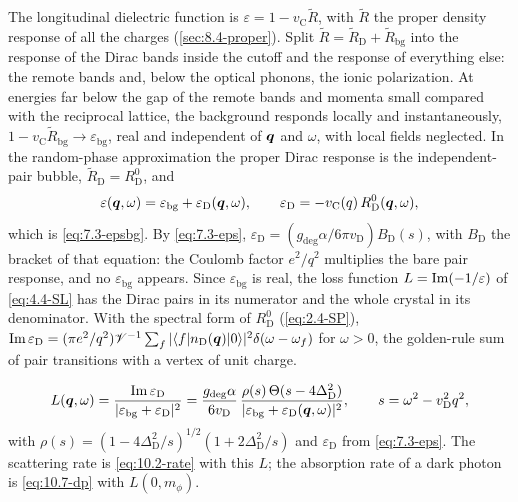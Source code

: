 The longitudinal dielectric function is $\varepsilon = 1 - v_{\mathrm{C}}\tilde R$, with $\tilde R$ the proper density response of all the charges (\cref{sec:8.4-proper}). Split $\tilde R = \tilde R_{\mathrm{D}} + \tilde R_{\mathrm{bg}}$ into the response of the Dirac bands inside the cutoff and the response of everything else: the remote bands and, below the optical phonons, the ionic polarization. At energies far below the gap of the remote bands and momenta small compared with the reciprocal lattice, the background responds locally and instantaneously, $1 - v_{\mathrm{C}}\tilde R_{\mathrm{bg}} \to \varepsilon_{\mathrm{bg}}$, real and independent of $\bm{q}$ and $\omega$, with local fields neglected. In the random-phase approximation the proper Dirac response is the independent-pair bubble, $\tilde R_{\mathrm{D}} = R^0_{\mathrm{D}}$, and
\begin{equation}
  \varepsilon(\bm{q},\omega) = \varepsilon_{\mathrm{bg}} + \varepsilon_{\mathrm{D}}(\bm{q},\omega), \qquad \varepsilon_{\mathrm{D}} = -v_{\mathrm{C}}(q)\,R^0_{\mathrm{D}}(\bm{q},\omega) ,
  \label{eq:D.41-eps}
\end{equation}
which is \cref{eq:7.3-epsbg}. By \cref{eq:7.3-eps}, $\varepsilon_{\mathrm{D}} = (g_{\mathrm{deg}}\alpha/6\pi v_{\mathrm{D}})B_{\mathrm{D}}(s)$, with $B_{\mathrm{D}}$ the bracket of that equation: the Coulomb factor $e^2/q^2$ multiplies the bare pair response, and no $\varepsilon_{\mathrm{bg}}$ appears. Since $\varepsilon_{\mathrm{bg}}$ is real, the loss function $L = \operatorname{Im}(-1/\varepsilon)$ of \cref{eq:4.4-SL} has the Dirac pairs in its numerator and the whole crystal in its denominator. With the spectral form of $R^0_{\mathrm{D}}$ (\cref{eq:2.4-SP}), $\operatorname{Im}\varepsilon_{\mathrm{D}} = (\pi e^2/q^2)\mathscr{V}^{-1}\sum_f|\langle f|n_{\mathrm{D}}(\bm{q})|0\rangle|^2\delta(\omega - \omega_f)$ for $\omega > 0$, the golden-rule sum of pair transitions with a vertex of unit charge.
\begin{keyresult}
\begin{equation}
  L(\bm{q},\omega) = \frac{\operatorname{Im}\varepsilon_{\mathrm{D}}}{|\varepsilon_{\mathrm{bg}} + \varepsilon_{\mathrm{D}}|^2} = \frac{g_{\mathrm{deg}}\alpha}{6v_{\mathrm{D}}}\,\frac{\rho(s)\,\Theta(s - 4\Delta_{\mathrm{D}}^2)}{|\varepsilon_{\mathrm{bg}} + \varepsilon_{\mathrm{D}}(\bm{q},\omega)|^2} , \qquad s = \omega^2 - v_{\mathrm{D}}^2q^2 ,
  \label{eq:16.1-L}
\end{equation}
with $\rho(s) = (1 - 4\Delta_{\mathrm{D}}^2/s)^{1/2}(1 + 2\Delta_{\mathrm{D}}^2/s)$ and $\varepsilon_{\mathrm{D}}$ from \cref{eq:7.3-eps}. The scattering rate is \cref{eq:10.2-rate} with this $L$; the absorption rate of a dark photon is \cref{eq:10.7-dp} with $L(0, m_\phi)$.
\end{keyresult}
